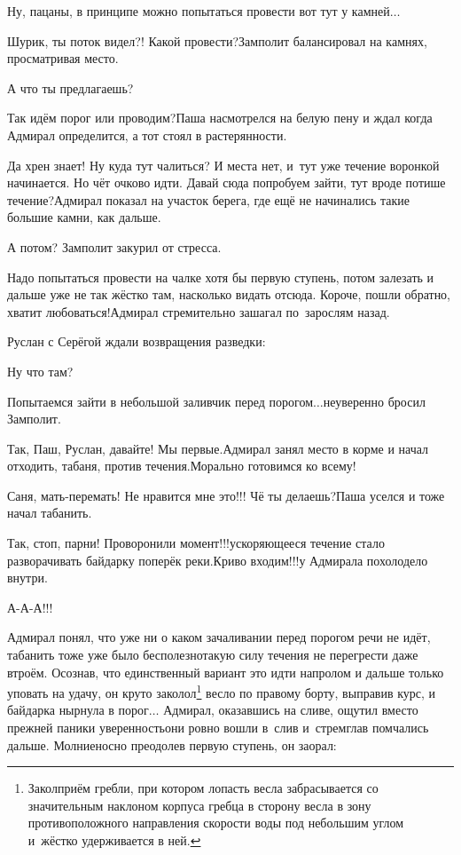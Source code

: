 \diagdash Ну, пацаны, в принципе можно попытаться провести вот тут у камней$\ldots$

\diagdash Шурик, ты поток видел?! Какой провести?\mdash Замполит балансировал на камнях, просматривая место.

\diagdash А что ты предлагаешь?

\diagdash Так идём порог или проводим?\mdash Паша насмотрелся на белую пену и ждал когда Адмирал определится, а тот стоял в растерянности. 

\diagdash Да хрен знает! Ну куда тут чалиться? И места нет, и~тут уже течение воронкой начинается. Но чёт очково идти. Давай сюда попробуем зайти, тут вроде потише течение?\mdash Адмирал показал на участок берега, где ещё не начинались такие большие камни, как дальше. 

\diagdash А потом? \mdash Замполит закурил от стресса.

\diagdash Надо попытаться провести на чалке хотя бы первую ступень, потом залезать и дальше уже не так жёстко там, насколько видать отсюда. Короче, пошли обратно, хватит любоваться!\mdash Адмирал стремительно зашагал по~зарослям назад.

Руслан с Серёгой ждали возвращения разведки:

\diagdash Ну что там?

\diagdash Попытаемся зайти в небольшой заливчик перед порогом$\ldots$\mdash неуверенно бросил Замполит.

\diagdash Так, Паш, Руслан, давайте! Мы первые.\mdash Адмирал занял место в корме и начал отходить, табаня, против течения.\mdash Морально готовимся ко всему!

\diagdash Саня, мать-перемать! Не нравится мне это!!! Чё ты делаешь?\mdash Паша уселся и тоже начал табанить.

\diagdash Так, стоп, парни! Проворонили момент!!!\mdash ускоряющееся течение стало разворачивать байдарку поперёк реки.\mdash Криво входим!!!\mdash у Адмирала похолодело внутри.

\diagdash А-А-А!!!

\renewcommand*{\thefootnote}{\fnsymbol{footnote}}
\setcounter{footnote}{0}
Адмирал понял, что уже ни о каком зачаливании перед порогом речи не идёт, табанить тоже уже было бесполезно\mdash такую силу течения не перегрести даже втроём. Осознав, что единственный вариант это идти напролом и дальше только уповать на удачу, он круто заколол\footnote{Закол\mdash приём гребли, при котором лопасть весла забрасывается со значительным наклоном корпуса гребца в сторону весла в зону противоположного направления скорости воды под небольшим углом и~жёстко удерживается в ней.} весло по правому борту, выправив курс, и байдарка нырнула в порог$\ldots$ Адмирал, оказавшись на сливе, ощутил вместо прежней паники уверенность\mdash они ровно вошли в~слив и~стремглав помчались дальше. Молниеносно преодолев первую ступень, он заорал:

